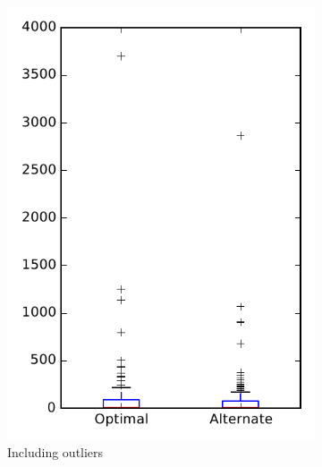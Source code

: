
\begin{figure}
    \centering
    \begin{subfigure}{.4\textwidth}
        \centering
        \includegraphics[height=0.4\textheight]{figures/combo/flt_rq1_openjpa}
        \caption{Including outliers}\label{fig:combo:flt:rq1:openjpa_outlier}
    \end{subfigure}%
    \begin{subfigure}{.4\textwidth}
        \centering

\end{subfigure}
\end{figure}
